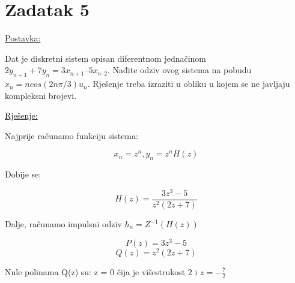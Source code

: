 \documentclass[12pt]{article}
\begin{document}
\newpage

\section*{Zadatak 5\label{Z5}}

\underline{Postavka:}

Dat je diskretni sistem opisan diferentnom jednačinom $2 y_{n+1} + 7 y_n = 3 x_{n+1} – 5 x_{n–2}$. Nađite odziv ovog sistema na pobudu $x_n = n cos (2n \pi / 3) u_n$. Rješenje treba izraziti u obliku u kojem se ne javljaju kompleksni brojevi.

\underline{Rješenje:}

Najprije računamo funkciju sistema:

$$x_n = z^n, y_n = z^n H(z)$$

Dobije se:

$$H (z) = \frac{3z^3 - 5}{z^2 (2z + 7)}$$

Dalje, računamo impulsni odziv $h_n = Z^{-1}(H(z))$

$$P(z) = 3z^3 - 5$$
$$Q(z) = z^2(2z + 7)$$

Nule polinama Q(z) su: z = 0 čija je višestrukost 2 i $ z = - \frac{7}{2}$
\end{document}
